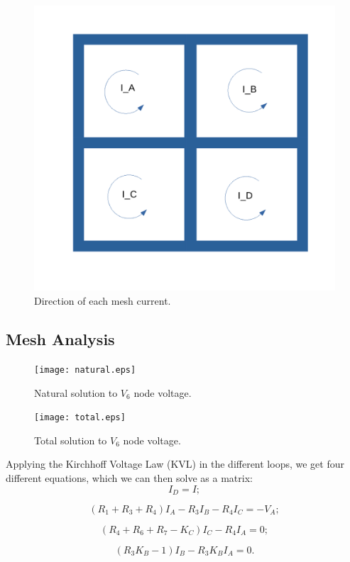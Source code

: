 \begin{figure}[h] \centering
\includegraphics[width=0.4\linewidth]{current.pdf}
\caption{Direction of each mesh current.}
\label{fig:current}
\end{figure}

\subsection{Mesh Analysis}

\begin{figure}[h] \centering
\texttt{[image: natural.eps]}
\caption{Natural solution to $V_{6}$ node voltage.}
\label{fig:current}
\end{figure}

\begin{figure}[h] \centering
\texttt{[image: total.eps]}
\caption{Total solution to $V_{6}$ node voltage.}
\label{fig:current}
\end{figure}

Applying the Kirchhoff Voltage Law (KVL) in the different loops, we get four different equations, which we can then solve as a matrix:
\begin{equation}
  I_D=I;
\end{equation}

\begin{equation}
  (R_1+R_3+R_4)I_A-R_3I_B-R_4I_C=-V_A;
\end{equation}

\begin{equation}
  (R_4+R_6+R_7-K_C)I_C-R_4I_A=0;
\end{equation}

\begin{equation}
  (R_3K_B-1)I_B-R_3K_BI_A=0.
\end{equation}

